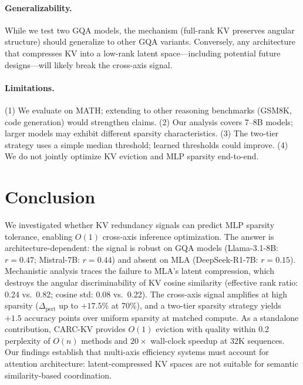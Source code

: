 \documentclass[11pt,a4paper]{article}
\begin{document}
\paragraph{Generalizability.}
While we test two GQA models, the mechanism (full-rank KV preserves angular structure) should generalize to other GQA variants.
Conversely, any architecture that compresses KV into a low-rank latent space---including potential future designs---will likely break the cross-axis signal.

\paragraph{Limitations.}
(1) We evaluate on MATH; extending to other reasoning benchmarks (GSM8K, code generation) would strengthen claims.
(2) Our analysis covers 7--8B models; larger models may exhibit different sparsity characteristics.
(3) The two-tier strategy uses a simple median threshold; learned thresholds could improve.
(4) We do not jointly optimize KV eviction and MLP sparsity end-to-end.

\section{Conclusion}
\label{sec:conclusion}

We investigated whether KV redundancy signals can predict MLP sparsity tolerance, enabling $O(1)$ cross-axis inference optimization.
The answer is architecture-dependent: the signal is robust on GQA models (Llama-3.1-8B: $r = 0.47$; Mistral-7B: $r = 0.44$) and absent on MLA (DeepSeek-R1-7B: $r = 0.15$).
Mechanistic analysis traces the failure to MLA's latent compression, which destroys the angular discriminability of KV cosine similarity (effective rank ratio: 0.24 vs.\ 0.82; cosine std: 0.08 vs.\ 0.22).
The cross-axis signal amplifies at high sparsity ($\Delta_\text{pert}$ up to $+17.5\%$ at 70\%), and a two-tier sparsity strategy yields $+1.5$ accuracy points over uniform sparsity at matched compute.
As a standalone contribution, CARC-KV provides $O(1)$ eviction with quality within 0.2 perplexity of $O(n)$ methods and $20\times$ wall-clock speedup at 32K sequences.
Our findings establish that multi-axis efficiency systems must account for attention architecture: latent-compressed KV spaces are not suitable for semantic similarity-based coordination.
\end{document}
